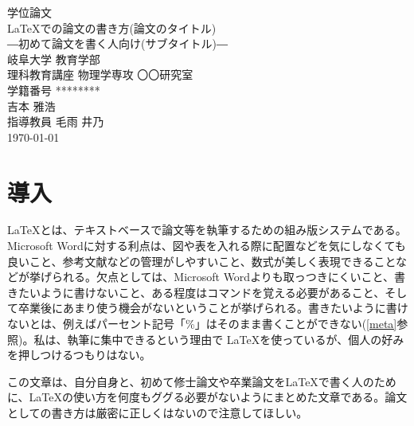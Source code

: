 \documentclass[a4j,openany,12pt]{jsbook}
\begin{document}
\begin{titlepage}
    \centering
    \vspace*{10truept}
    {\LARGE 学位論文}\\
    \vspace{100truept}
    {\LARGE \LaTeX での論文の書き方(論文のタイトル)}\\ %
    \vspace{10truept}
    {\Large ―初めて論文を書く人向け(サブタイトル)―}\\ %
    \vspace{140truept}
    {\Large 岐阜大学 教育学部}\\ %
    \vspace{10truept}
    {\Large 理科教育講座 物理学専攻 〇〇研究室}\\ %
    \vspace{20truept}
    {\Large 学籍番号 ********}\\ %
    \vspace{20truept}
    {\Large 吉本 雅浩}\\ %
    \vspace{50truept}
    {\Large 指導教員 毛雨 井乃}\\
    \vspace{50truept}
    {\Large \today} %
\end{titlepage}

\thispagestyle{empty} %
\tableofcontents %
\chapter{導入}

\LaTeX とは、テキストベースで論文等を執筆するための組み版システムである。Microsoft Wordに対する利点は、図や表を入れる際に配置などを気にしなくても良いこと、参考文献などの管理がしやすいこと、数式が美しく表現できることなどが挙げられる。欠点としては、Microsoft Wordよりも取っつきにくいこと、書きたいように書けないこと、ある程度はコマンドを覚える必要があること、そして卒業後にあまり使う機会がないということが挙げられる。書きたいように書けないとは、例えばパーセント記号「\%」はそのまま書くことができない(\ref{meta}参照)。私は、執筆に集中できるという理由で \LaTeX を使っているが、個人の好みを押しつけるつもりはない。

この文章は、自分自身と、初めて修士論文や卒業論文を\LaTeX で書く人のために、\LaTeX の使い方を何度もググる必要がないようにまとめた文章である。論文としての書き方は厳密に正しくはないので注意してほしい。
\end{document}
